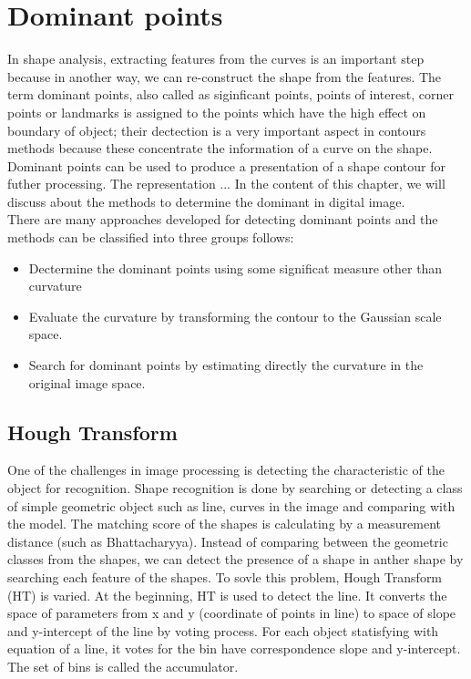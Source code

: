 \chapter{Dominant points}
In shape analysis, extracting features from the curves is an important step because in another way, we can re-construct the shape from the features. The term dominant points, also called as siginficant points, points of interest, corner points or landmarks is assigned to the points which have the high effect on boundary of object; their dectection is a very important aspect in contours methods because these concentrate the information of a curve on the shape.\\[0.2cm]
Dominant points can be used to produce a presentation of a shape contour for futher processing. The representation ...
In the content of this chapter, we will discuss about the methods to determine the dominant in digital image.\\[0.2cm]
There are many approaches developed for detecting dominant points and the methods can be classified into three groups follows:
\begin{itemize}
	\item Dectermine the dominant points using some significat measure other than curvature
	\item Evaluate the curvature by transforming the contour to the Gaussian scale space.
	\item Search for dominant points by estimating directly the curvature in the original image space.
\end{itemize}
\section{Hough Transform}
One of the challenges in image processing is detecting the characteristic of the object for recognition. Shape recognition is done by searching or detecting a class of simple geometric object such as line, curves in the image and comparing with the model. The matching score of the shapes is calculating by a measurement distance (such as Bhattacharyya). Instead of comparing between the geometric classes from the shapes, we can detect the presence of a shape in anther shape by searching each feature of the shapes. To sovle this problem, Hough Transform (HT)\cite{mukhopadhyay2015survey} is varied. At the beginning, HT\cite{vc1962method} is used to detect the line. It converts the space of parameters from x and y (coordinate of points in line) to space of slope and y-intercept of the line by voting process. For each object statisfying with equation of a line, it votes for the bin have correspondence slope and y-intercept. The set of bins is called the accumulator.
